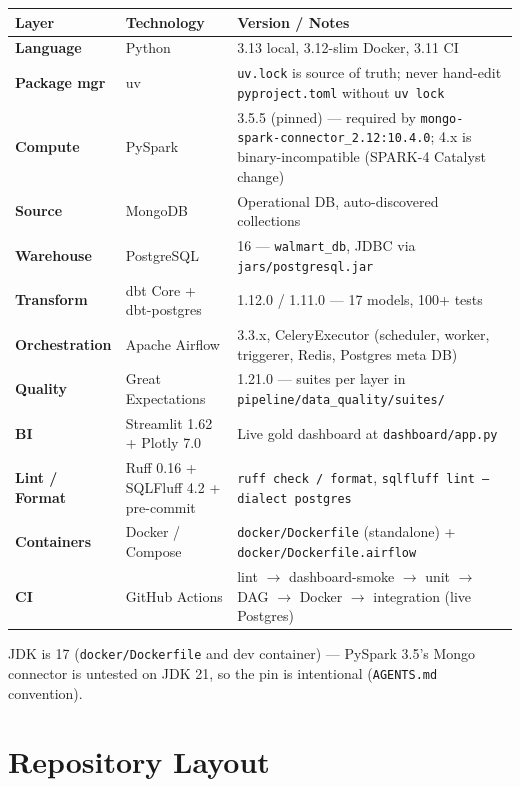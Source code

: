 \documentclass[11pt,a4paper]{article}
\begin{document}
\begin{longtable}{>{\bfseries}l l l}
\toprule
Layer & Technology & Version / Notes \\
\midrule
\endhead
Language & Python & 3.13 local, 3.12-slim Docker, 3.11 CI \\
Package mgr & uv & \texttt{uv.lock} is source of truth; never hand-edit \texttt{pyproject.toml} without \texttt{uv lock} \\
Compute & PySpark & 3.5.5 (pinned) — required by \texttt{mongo-spark-connector\_2.12:10.4.0}; 4.x is binary-incompatible (SPARK-4 Catalyst change) \\
Source & MongoDB & Operational DB, auto-discovered collections \\
Warehouse & PostgreSQL & 16 — \texttt{walmart\_db}, JDBC via \texttt{jars/postgresql.jar} \\
Transform & dbt Core + dbt-postgres & 1.12.0 / 1.11.0 — 17 models, 100+ tests \\
Orchestration & Apache Airflow & 3.3.x, CeleryExecutor (scheduler, worker, triggerer, Redis, Postgres meta DB) \\
Quality & Great Expectations & 1.21.0 — suites per layer in \texttt{pipeline/data\_quality/suites/} \\
BI & Streamlit 1.62 + Plotly 7.0 & Live gold dashboard at \texttt{dashboard/app.py} \\
Lint / Format & Ruff 0.16 + SQLFluff 4.2 + pre-commit & \texttt{ruff check / format}, \texttt{sqlfluff lint --dialect postgres} \\
Containers & Docker / Compose & \texttt{docker/Dockerfile} (standalone) + \texttt{docker/Dockerfile.airflow} \\
CI & GitHub Actions & lint $\rightarrow$ dashboard-smoke $\rightarrow$ unit $\rightarrow$ DAG $\rightarrow$ Docker $\rightarrow$ integration (live Postgres) \\
\bottomrule
\end{longtable}

JDK is 17 (\texttt{docker/Dockerfile} and dev container) — PySpark 3.5's Mongo connector is untested on JDK 21, so the pin is intentional (\texttt{AGENTS.md} convention).

\section{Repository Layout}
\end{document}
